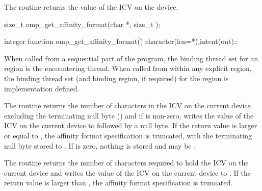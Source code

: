 \summary
The  routine returns the value of the
 ICV on the device.

\format
\begin{ccppspecific}
\begin{ompcFunction}
size_t omp_get_affinity_format(char *, size_t );
\end{ompcFunction}
\end{ccppspecific}

\begin{fortranspecific}
\begin{ompfFunction}
integer function omp_get_affinity_format()
character(len=*),intent(out)::
\end{ompfFunction}
\end{fortranspecific}

\binding
When called from a sequential part of the program, the binding thread set for an
 region is the encountering thread. When called
from within any explicit  region, the binding thread set (and binding region, if
required) for the  region is implementation defined.

\effect
\begin{ccppspecific}
The  routine returns the number of characters
in the  ICV on the current device excluding the terminating
null byte () and if  is non-zero, writes the value of the
 ICV on the current device to  followed
by a null byte.  If the return value is larger or equal to ,
the affinity format specification is truncated, with the terminating
null byte stored to {}.  If  is
zero, nothing is stored and  may be .
\end{ccppspecific}

\begin{fortranspecific}
The  routine returns the number of characters required
to hold the  ICV on the current device and writes the value of the
 ICV on the current device to .
If the return value is larger than {}, the affinity
format specification is truncated.
\end{fortranspecific}


